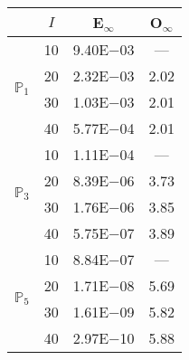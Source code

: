 \begin{table}[H]
\centering
\begin{tabular}{@{}l c c c@{}}
\toprule
 & $I$ & E$_{\infty}$ & O$_{\infty}$\\
\midrule
\multirow{4}{*}{$\mathbb{P}_{1}$}
 & 10 & 9.40E$-$03 & ---\\
 & 20 & 2.32E$-$03 & 2.02  \\
 & 30 & 1.03E$-$03 & 2.01  \\
 & 40 & 5.77E$-$04 & 2.01  \\
\midrule
\multirow{4}{*}{$\mathbb{P}_{3}$}
 & 10 & 1.11E$-$04 & ---\\
 & 20 & 8.39E$-$06 & 3.73  \\
 & 30 & 1.76E$-$06 & 3.85  \\
 & 40 & 5.75E$-$07 & 3.89  \\
\midrule
\multirow{4}{*}{$\mathbb{P}_{5}$}
 & 10 & 8.84E$-$07 & ---\\
 & 20 & 1.71E$-$08 & 5.69  \\
 & 30 & 1.61E$-$09 & 5.82  \\
 & 40 & 2.97E$-$10 & 5.88  \\
\bottomrule
\end{tabular}
\end{table}

